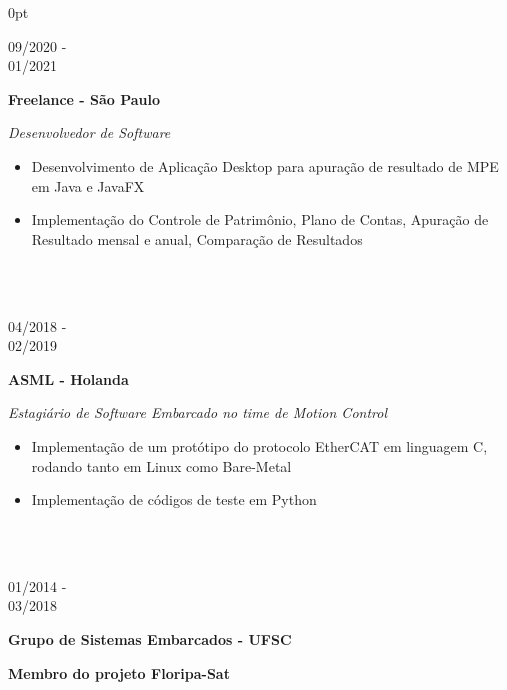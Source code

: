 \documentclass[a4paper]{article}
\begin{document}
\begin{adjustwidth}{\parindent}{0pt}
\begin{minipage}[t]{0.65\textwidth}
\begin{minipage}[t]{0.2\textwidth}
  \large{09/2020 - \\ 01/2021}
  \end{minipage}
  \begin{minipage}[t]{0.8\textwidth}
  {
    \setlength{\parskip}{5.5pt}
    \Large{\textbf{Freelance - São Paulo}}
  
    \large{\textit{Desenvolvedor de Software}}
    \begin{itemize}
      \item \normalsize{Desenvolvimento de Aplicação Desktop para apuração de resultado de MPE em Java e JavaFX}
      \item \normalsize{Implementação do Controle de Patrimônio, Plano de Contas, Apuração de Resultado mensal e anual, Comparação de Resultados}
    \end{itemize}
  }
  \end{minipage} \\ \\

\begin{minipage}[t]{0.2\textwidth}
\large{04/2018 - \\ 02/2019}
\end{minipage}
\begin{minipage}[t]{0.8\textwidth}
{
  \setlength{\parskip}{5.5pt}
  \Large{\textbf{ASML - Holanda}}
  
  \large{\textit{Estagiário de Software Embarcado no time de Motion Control}}
  \begin{itemize}
    \item \normalsize{Implementação de um protótipo do protocolo EtherCAT em linguagem C, rodando tanto em Linux como Bare-Metal}
    \item \normalsize{Implementação de códigos de teste em Python}
  \end{itemize}
}
\end{minipage} \\ \\

\begin{minipage}[t]{0.2\textwidth}
  \large{01/2014 - \\ 03/2018}
\end{minipage}
\begin{minipage}[t]{0.8\textwidth}
{
  \setlength{\parskip}{5.5pt}
  \Large{\textbf{Grupo de Sistemas Embarcados - UFSC}}
  
  \large{\textbf{Membro do projeto Floripa-Sat}}
  
}
\end{minipage}
\end{minipage}
\end{adjustwidth}
\end{document}

